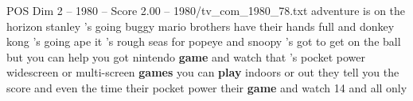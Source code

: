 \begin{textsample}{POS Dim 2 – 1980 – Score 2.00 – 1980/tv\_com\_1980\_78.txt}  \label{ex:f2_pos_063}
adventure is on the horizon stanley 's going buggy mario brothers have their hands full and donkey kong 's going ape it 's rough seas for popeye and snoopy 's got to get on the ball but you can help you got nintendo \textbf{game} and watch that 's pocket power widescreen or multi-screen \textbf{games} you can \textbf{play} indoors or out they tell you the score and even the time their pocket power their \textbf{game} and watch 14 and all only

\end{textsample}
